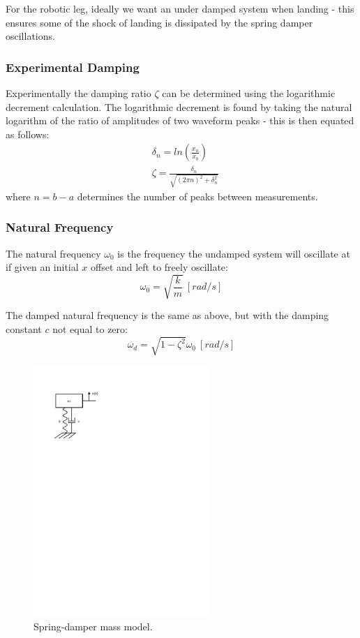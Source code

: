 For the robotic leg, ideally we want an under damped system when landing - this ensures some of the shock of landing is dissipated by the spring damper oscillations.

\subsubsection{Experimental Damping}
Experimentally the damping ratio $\zeta$ can be determined using the logarithmic decrement calculation. The logarithmic decrement is found by taking the natural logarithm of the ratio of amplitudes of two waveform peaks - this is then equated as follows:
\begin{equation}
\begin{aligned}
&\delta_n = ln(\frac{x_a}{x_{b}}) \\
&\zeta = \frac{\delta_n}{\sqrt{(2 \pi n)^2 + \delta_n^2}}
\end{aligned}
\end{equation}
where $n = b-a$ determines the number of peaks between measurements.

\subsubsection{Natural Frequency}
The natural frequency $\omega_0$ is the frequency the undamped system will oscillate at if given an initial $x$ offset and left to freely oscillate:
\begin{equation}
\omega_0 = \sqrt{\frac{k}{m}}\ [rad/s]
\end{equation}

The damped natural frequency is the same as above, but with the damping constant $c$ not equal to zero:
\begin{equation}
\omega_d = \sqrt{1 - \zeta^2}\omega_0\ [rad/s]
\end{equation}

\begin{figure}
\centering
\includegraphics[clip, trim=2cm 20cm 13cm 2cm, page = 1, width=0.6\textwidth]{images/geometry/spring-damper-mass} 
\caption{Spring-damper mass model.}
\label{fig:Spring-damper mass model}
\end{figure}

